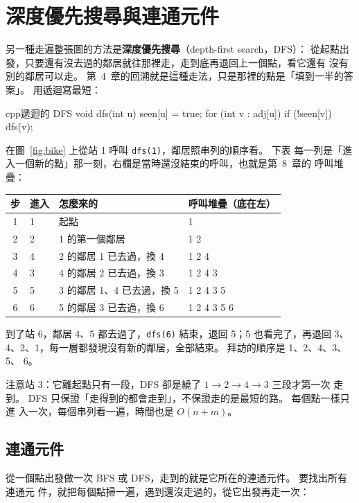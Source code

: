 \section{深度優先搜尋與連通元件}
\label{sec:dfs}

另一種走遍整張圖的方法是\textbf{深度優先搜尋}（depth-first search，DFS）：
從起點出發，只要還有沒去過的鄰居就往那裡走，走到底再退回上一個點，看它還有
沒有別的鄰居可以走。 第~4~章的回溯就是這種走法，只是那裡的點是「填到一半的答
案」。 用遞迴寫最短：

\begin{code}{cpp}{遞迴的 DFS}
void dfs(int u) {
    seen[u] = true;
    for (int v : adj[u]) {
        if (!seen[v]) {
            dfs(v);
        }
    }
}
\end{code}

在圖~\ref{fig:bike} 上從站 1 呼叫 \texttt{dfs(1)}，鄰居照串列的順序看。 下表
每一列是「進入一個新的點」那一刻，右欄是當時還沒結束的呼叫，也就是第~8~章的
呼叫堆疊：

\begin{center}
\begin{tabular}{clll}
\toprule
步 & 進入 & 怎麼來的 & 呼叫堆疊（底在左）\\
\midrule
1 & 1 & 起點 & 1 \\
2 & 2 & 1 的第一個鄰居 & 1 2 \\
3 & 4 & 2 的鄰居 1 已去過，換 4 & 1 2 4 \\
4 & 3 & 4 的鄰居 2 已去過，換 3 & 1 2 4 3 \\
5 & 5 & 3 的鄰居 1、4 已去過，換 5 & 1 2 4 3 5 \\
6 & 6 & 5 的鄰居 3 已去過，換 6 & 1 2 4 3 5 6 \\
\bottomrule
\end{tabular}
\end{center}

到了站 6，鄰居 4、5 都去過了，\texttt{dfs(6)} 結束，退回 5；5 也看完了，再退回
3、4、2、1，每一層都發現沒有新的鄰居，全部結束。 拜訪的順序是 1、2、4、3、5、
6。

注意站 3：它離起點只有一段，DFS 卻是繞了 $1 \to 2 \to 4 \to 3$ 三段才第一次
走到。 DFS 只保證「走得到的都會走到」，不保證走的是最短的路。 每個點一樣只進
入一次，每個串列看一遍，時間也是 $O(n + m)$。

\subsection{連通元件}

從一個點出發做一次 BFS 或 DFS，走到的就是它所在的連通元件。 要找出所有連通元
件，就把每個點掃一遍，遇到還沒走過的，從它出發再走一次：

